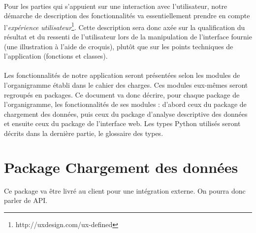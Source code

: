 		\paragraph{}Pour les parties qui s'appuient sur une interaction avec l'utilisateur, notre démarche de description des fonctionnalités va essentiellement prendre en compte l'\textit{expérience utilisateur}\footnote{http://uxdesign.com/ux-defined}. Cette description sera donc axée sur la qualification du résultat et du ressenti de l'utilisateur lors de la manipulation de l'interface fournie (une illustration à l'aide de croquis), plutôt que sur les points techniques de l'application (fonctions et classes).
		\paragraph{}Les fonctionnalités de notre application seront présentées selon les modules de l'organigramme établi dans le cahier des charges. Ces modules eux-mêmes seront regroupés en packages. Ce document va donc décrire, pour chaque package de l'organigramme, les fonctionnalités de ses modules : d'abord ceux du package de chargement des données, puis ceux du package d'analyse descriptive des données et ensuite ceux du package de l'interface web. Les types Python utilisés seront décrits dans la dernière partie, le glossaire des types.
		
	\section{Package Chargement des données}
	Ce package va être livré au client pour une intégration externe. On pourra donc parler de API.
		
